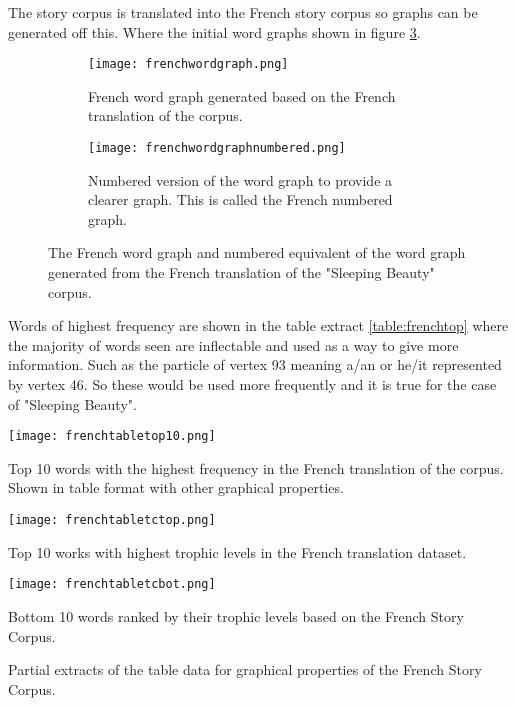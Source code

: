 The story corpus is translated into the French story corpus so graphs can be generated off this. Where the initial word graphs shown in figure \ref{fig:fregraph}. 

\begin{figure}[H]
\centering
\begin{subfigure}{.45\textwidth}
	\texttt{[image: frenchwordgraph.png]}
	\caption{French word graph generated based on the French translation of the corpus.}
	\label{fig:freword}
\end{subfigure}
\hfill
\begin{subfigure}{.45\textwidth}
	\texttt{[image: frenchwordgraphnumbered.png]}
	\caption{Numbered version of the word graph to provide a clearer graph. This is called the French numbered graph.}
	\label{fig:frenum}
\end{subfigure}
\caption{The French word graph and numbered equivalent of the word graph generated from the French translation of the "Sleeping Beauty" corpus.}
\label{fig:fregraph}
\end{figure}

Words of highest frequency are shown in the table extract \ref{table:frenchtop} where the majority of words seen are inflectable and used as a way to give more information. Such as the particle of vertex 93 meaning a/an or he/it represented by vertex 46. So these would be used more frequently and it is true for the case of "Sleeping Beauty".
\begin{table}[H]
\centering
\texttt{[image: frenchtabletop10.png]}
\caption{Top 10 words with the highest frequency in the French translation of the corpus. Shown in table format with other graphical properties. }
\label{table:frenchtop}
\end{table}

\begin{table}[H]
\centering
\begin{subtable}{.45\textwidth}
	\centering
	\texttt{[image: frenchtabletctop.png]}
	\caption{Top 10 works with highest trophic levels in the French translation dataset.}
	\label{table:frenchtoptc}
\end{subtable}
\hfill
\begin{subtable}{.45\textwidth}
	\centering
	\texttt{[image: frenchtabletcbot.png]}
	\caption{Bottom 10 words ranked by their trophic levels based on the French Story Corpus.}
	\label{table:frenchbottc}
\end{subtable}
\caption{Partial extracts of the table data for graphical properties of the French Story Corpus.}
\end{table}

